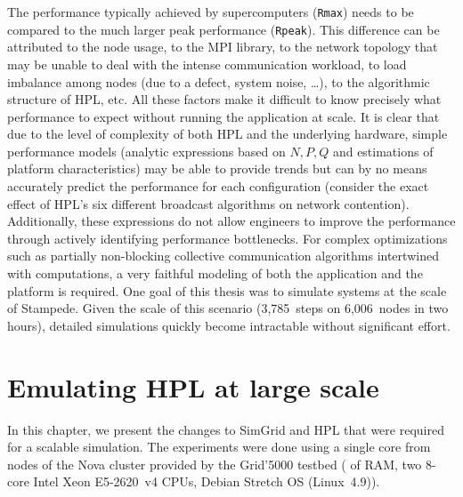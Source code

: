         The performance typically achieved by supercomputers (\texttt{Rmax}) needs to be compared to the much larger
        peak performance (\texttt{Rpeak}). This difference can be attributed to the node usage, to the MPI library, to
        the network topology that may be unable to deal with the intense communication workload, to load imbalance among
        nodes (\eg due to a defect, system noise, \ldots), to the algorithmic structure of HPL, etc. All these factors
        make it difficult to know precisely what performance to expect without running the application at scale.  It is
        clear that due to the level of complexity of both HPL and the underlying hardware, simple performance models
        (analytic expressions based on $N, P, Q$ and estimations of platform characteristics) may be able to provide
        trends but can by no means accurately predict the performance for each configuration (\eg consider the exact
        effect of HPL's six different broadcast algorithms on network contention). Additionally, these expressions do
        not allow engineers to improve the performance through actively identifying performance bottlenecks.  For
        complex optimizations such as partially non-blocking collective communication algorithms intertwined with
        computations, a very faithful modeling of both the application and the platform is required. One goal of this
        thesis was to simulate systems at the scale of Stampede. Given the scale of this scenario (3,785~steps on
        6,006 nodes in two hours), detailed simulations quickly become intractable without significant effort.

\chapter{Emulating HPL at large scale}%
\label{chapter:prediction:emulation}

    In this chapter, we present the changes to SimGrid and HPL that were required for a scalable simulation.  The
    experiments were done using a single core from nodes of the Nova cluster provided by the Grid'5000
    testbed\cite{grid5000} ( of RAM, two 8-core Intel Xeon E5-2620 v4 CPUs, Debian Stretch OS
    (Linux 4.9)).


